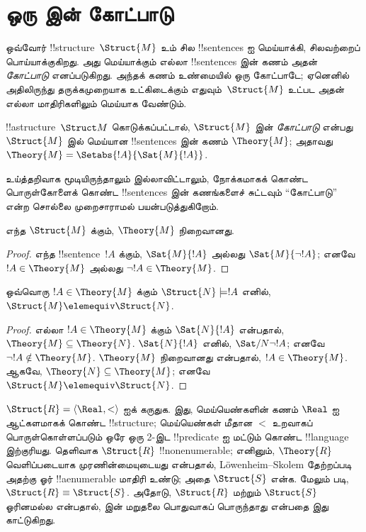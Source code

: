 \documentclass[../../../include/open-logic-section]{subfiles}
\begin{document}


\section{ஒரு  இன் கோட்பாடு}

ஒவ்வோர் !!{structure}~$\Struct{M}$ உம் சில !!{sentence}s ஐ
மெய்யாக்கி, சிலவற்றைப் பொய்யாக்குகிறது. அது மெய்யாக்கும் எல்லா
!!{sentence}s இன் கணம் அதன் \emph{கோட்பாடு} எனப்படுகிறது.
அந்தக் கணம் உண்மையில் ஒரு கோட்பாடே; ஏனெனில் அதிலிருந்து தருக்கமுறையாக
உட்கிடைக்கும் எதுவும்~$\Struct{M}$ உட்பட அதன் எல்லா மாதிரிகளிலும்
மெய்யாக வேண்டும்.

\begin{defn}
  !!a{structure}~$\Struct M$ கொடுக்கப்பட்டால், $\Struct{M}$ இன்
  \emph{கோட்பாடு} என்பது $\Struct{M}$ இல் மெய்யான !!{sentence}s இன்
  கணம் $\Theory{M}$; அதாவது $\Theory{M} =
  \Setabs{!A}{\Sat{M}{!A}}$.
\end{defn}

உய்த்தறிவாக மூடியிருந்தாலும் இல்லாவிட்டாலும், நோக்கமாகக் கொண்ட
பொருள்கோளைக் கொண்ட !!{sentence}s இன் கணங்களைச் சுட்டவும் ``கோட்பாடு''
என்ற சொல்லை முறைசாராமல் பயன்படுத்துகிறோம்.

\begin{prop}
எந்த $\Struct{M}$ க்கும், $\Theory{M}$ நிறைவானது.
\end{prop}

\begin{proof}
எந்த !!{sentence}~$!A$ க்கும், $\Sat{M}{!A}$ அல்லது
$\Sat{M}{\lnot !A}$; எனவே $!A \in \Theory{M}$ அல்லது
$\lnot !A \in \Theory{M}$.
\end{proof}

\begin{prop}
  ஒவ்வொரு $!A \in \Theory{M}$ க்கும் $\Struct{N} \models !A$
  எனில், $\Struct{M} \elemequiv \Struct{N}$.
\end{prop}

\begin{proof}
எல்லா $!A \in \Theory{M}$ க்கும் $\Sat{N}{!A}$ என்பதால்,
$\Theory{M} \subseteq
\Theory{N}$. $\Sat{N}{!A}$ எனில், $\Sat/{N}{\lnot !A}$; எனவே
$\lnot !A
\notin \Theory{M}$. $\Theory{M}$ நிறைவானது என்பதால், $!A \in
\Theory{M}$. ஆகவே, $\Theory{N} \subseteq \Theory{M}$; எனவே
$\Struct{M} \elemequiv \Struct{N}$.
\end{proof}

\begin{rem}
  $\Struct{R} = \langle\Real, <\rangle$ ஐக் கருதுக. இது, மெய்யெண்களின்
  கணம் $\Real$ ஐ ஆட்களமாகக் கொண்ட !!{structure}; மெய்யெண்கள் மீதான
  $<$ உறவாகப் பொருள்கொள்ளப்படும் ஒரே ஒரு 2-இட !!{predicate} ஐ மட்டும்
  கொண்ட !!{language} இற்குரியது. தெளிவாக $\Struct{R}$
  !!{nonenumerable}; எனினும், $\Theory{R}$ வெளிப்படையாக முரணின்மையுடையது
  என்பதால், L\"owenheim--Skolem தேற்றப்படி அதற்கு ஓர் !!a{enumerable}
  மாதிரி உண்டு; அதை $\Struct{S}$ என்க. மேலும்  படி,
  $\Struct{R}
  \equiv \Struct{S}$. அதோடு, $\Struct{R}$ மற்றும் $\Struct{S}$
  ஓரினமல்ல என்பதால்,  இன் மறுதலை பொதுவாகப்
  பொருந்தாது என்பதை இது காட்டுகிறது.
\end{rem}
\end{document}
